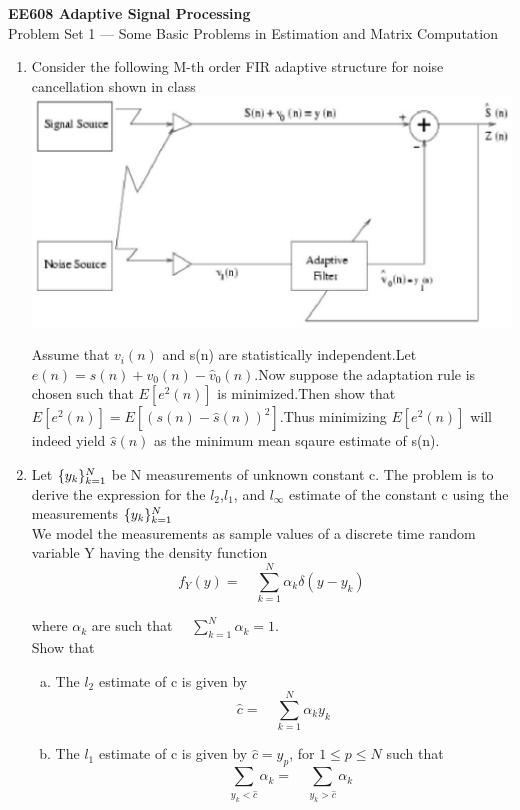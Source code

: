 \documentclass[journal,12pt,onecolumn]{IEEEtran}
\begin{document}
\centering \textbf{EE608  Adaptive Signal Processing}\\

\medskip
{Problem Set 1 — Some Basic Problems in Estimation and Matrix Computation}\\
\medskip

\begin{enumerate}
\setlength{\itemsep}{2em}

\item Consider the following M-th order FIR adaptive structure for noise cancellation shown in class\\
\includegraphics{figure1.eps}

Assume that $v_i(n)$ and s(n) are statistically independent.Let $e(n)=s(n)+v_0(n)-\hat{v}_0(n)$.Now suppose the adaptation rule is chosen such that $E[e^2(n)]$ is minimized.Then show that $E[e^2(n)]=E[(s(n)-\hat{s}(n))^2]$.Thus minimizing $E[e^2(n)]$ will indeed yield $\hat{s}(n)$ as the minimum mean sqaure estimate of s(n).

\item Let $\{\large{y}_k\}_{k=1}^N$ be N measurements of unknown constant c. The problem is to derive the expression for the $l_2$,$l_1$, and $l_\infty$ estimate of the constant c using the measurements $\{\large{y}_k\}_{k=1}^N$\\
We model the measurements as sample values of a discrete time random variable Y having the density function\\
                            $$f_Y(y)=\quad\sum_{k=1}^{N}{\alpha_k}{\delta(y-y_k)}$$
                             
where $\alpha_k$ are such that $\quad\sum_{k=1}^{N}{\alpha_k}=1.$\\
Show that
\begin{enumerate}[(a)]
\item The $l_2$ estimate of c is given by
$$\hat{c}=\quad\sum_{k=1}^{N}{\alpha_k}{y_k}$$
\item The $l_1$ estimate of c is given by $\hat{c}={y_p}$, for $1\leq{p}\leq{N}$ such that
$$\quad\sum_{y_k<{\hat{c}}}\alpha_{k}=\quad\sum_{y_k>{\hat{c}}}\alpha_{k}$$


\end{enumerate}
\end{enumerate}
\end{document}
